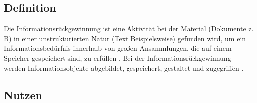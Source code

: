 
\subsection{Definition}
 
Die Informationsrückgewinnung ist eine Aktivität bei der Material (Dokumente z. B) in einer unstrukturierten Natur (Text Beispielsweise) gefunden wird, um ein Informationsbedürfnis innerhalb von großen Ansammlungen, die auf einem Speicher gespeichert sind, zu erfüllen \cite{MRS08} . Bei der Informationsrückgewinnung werden Informationsobjekte abgebildet, gespeichert, gestaltet und zugegriffen \cite{BRI99}.

\subsection{Nutzen}

